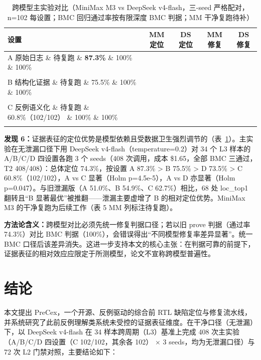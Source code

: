 \documentclass[journal]{IEEEtran}
\begin{document}
\begin{table}[!t]
\centering
\caption{跨模型主实验对比（MiniMax M3 vs DeepSeek v4-flash，三-seed 严格配对，n=102 每设置；BMC 回归通过率按有限深度 BMC 判据；MM 干净复跑待补）}
\label{tab:cross_model}
\scriptsize
\setlength{\tabcolsep}{4pt}
\renewcommand{\arraystretch}{1.12}
\begin{tabular}{p{}cccc}
\toprule
\textbf{设置} & \textbf{MM 定位} & \textbf{DS 定位} & \textbf{MM 修复} & \textbf{DS 修复} \\
\midrule
A 原始日志 \& 待复跑 \& \textbf{87.3\%} \& 100\% \& 100\% \\\\
B 结构化证据 \& 待复跑 \& 75.5\% \& 100\% \& 100\% \\\\
C 反例语义化 \& 待复跑 \& 60.8\%（102/102） \& 100\% \& 100\% \\\\
\bottomrule
\end{tabular}
\end{table}

\textbf{发现 6：}证据表征的定位优势是模型依赖且受数据卫生强烈调节的（表~\ref{tab:cross_model}）。主实验在无泄漏口径下用 DeepSeek v4-flash（temperature=0.2）对 34 个 L3 样本的 A/B/C/D 四设置各跑 3 个 seeds（408 次调用，成本 \$1.65，全部 BMC 三通过，T2 408/408）：总体定位 74.3\%，按设置 A 87.3\% > B 75.5\% > D 73.5\% > C 60.8\%（102/102），A vs C 显著（Holm p=4.5e-5），A vs D 亦显著（Holm p=0.047）。与旧泄漏版（A 51.0\%、B 54.9\%、C 62.7\%）相比，68 处 loc\_top1 翻转且“B 显著最优”被推翻——泄漏主要虚增了 B 的相对定位优势。MiniMax M3 的干净复跑为后续工作（表 5 MM 列标注待复跑）。

\textbf{方法论含义：}跨模型对比必须先统一修复判据口径；若以旧 prove 判据（通过率 74.3\%）对比 BMC 判据（100\%），会错误得出“不同模型修复率差异显著”。统一 BMC 口径后该差异消失。这进一步支持本文的核心主张：在判据可靠的前提下，证据表征的相对效应应限定于所测模型，论文不宣称跨模型普遍性。
\section{结论}

本文提出 PreCex，一个开源、反例驱动的综合前 RTL 缺陷定位与修复流水线，并系统研究了此前反例理解类系统未受控的证据表征维度。在干净口径（无泄漏）下，以 DeepSeek v4-flash 在 34 样本跨周期（L3）基准上完成 408 次主实验（A/B/C/D 四设置（C 102/102，其余各 102） $\times$ 3 seeds，均为无泄漏口径）与 72 次 L2 门禁对照，主要结论如下：
\end{document}
